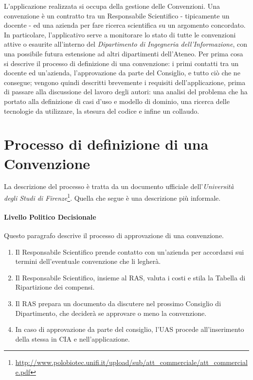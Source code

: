 L'applicazione realizzata si occupa della gestione delle Convenzioni. Una convenzione è un contratto tra un Responsabile Scientifico
- tipicamente un docente - ed una azienda per fare ricerca scientifica su un argomento concordato.
In particolare, l'applicativo serve a monitorare lo stato di tutte le convenzioni attive o esaurite all'interno del
\textsl{Dipartimento di Ingegneria dell'Informazione}, con una possibile futura estensione ad altri dipartimenti dell'Ateneo.\newline
Per prima cosa si descrive il processo di definizione di una convenzione: i primi contatti tra un docente ed un'azienda,
l'approvazione da parte del Consiglio, e tutto ciò che ne consegue; 
vengono quindi descritti brevemente i requisiti dell'applicazione, prima di passare alla discussione del lavoro degli autori:
una analisi del problema che ha portato alla definizione di casi d'uso e modello di dominio, una ricerca delle tecnologie da utilizzare, la stesura del codice
e infine un collaudo.


\section{Processo di definizione di una Convenzione}
La descrizione del processo è tratta da un documento ufficiale dell'\textsl{Università degli Studi di Firenze}\footnote{\url{http://www.polobiotec.unifi.it/upload/sub/att_commerciale/att_commerciale.pdf}}. Quella che segue è una descrizione più informale.

\paragraph{Livello Politico Decisionale}
Questo paragrafo descrive il processo di approvazione di una convenzione.\newline

\begin{enumerate}
\item Il Responsabile Scientifico prende contatto con un'azienda per accordarsi sui termini dell'eventuale convenzione che li legherà.
\item Il Responsabile Scientifico, insieme al RAS, valuta i costi e stila la Tabella di Ripartizione dei compensi.
\item Il RAS prepara un documento da discutere nel prossimo Consiglio di Dipartimento, che deciderà se approvare o meno la convenzione.
\item In caso di approvazione da parte del consiglio, l'UAS procede all'inserimento della stessa in CIA e nell'applicazione.
\end{enumerate}

